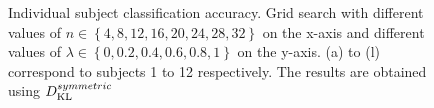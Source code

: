 \begin{figure}[h!]
{\label{fig:surf_s6_kld_sym}}
\caption{Individual subject classification accuracy. Grid search with different values of  $n \in \left\lbrace 4, 8, 12, 16, 20, 24, 28, 32 \right\rbrace $ on the x-axis and different values of $\lambda \in \left\lbrace 0, 0.2, 0.4, 0.6, 0.8, 1 \right\rbrace$ on the y-axis. (a) to (l) correspond to subjects 1 to 12 respectively. The results are obtained using $D_{\operatorname{KL}}^{symmetric}$}
\end{figure}

